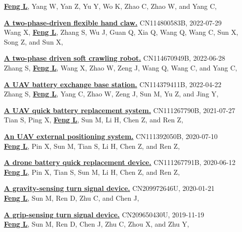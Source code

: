 \documentclass[a4paper,11pt]{article}
\begin{document}
\begin{enumerate}[leftmargin=*, labelsep=0.5em, align=left, itemindent=0em, label={[\arabic*]}]
\underline{\textbf{Feng L}}, Yang W, Yan Z, Yu Y, Wo K, Zhao C, Zhao W, and Yang C,
\item \href{https://patents.google.com/patent/CN114800583B}{\textbf{A two-phase-driven flexible hand claw.}} CN114800583B, 2022-07-29\\
Wang X, \underline{\textbf{Feng L}}, Zhang S, Wu J, Guan Q, Xia Q, Wang Q, Wang C, Sun X, Song Z, and Sun X,
\item \href{https://patents.google.com/patent/CN114670949B}{\textbf{A two-phase driven soft crawling robot.}} CN114670949B, 2022-06-28\\
Zhang S, \underline{\textbf{Feng L}}, Wang X, Zhao W, Zeng J, Wang Q, Wang C, and Yang C,
\item \href{https://patents.google.com/patent/CN114379411B}{\textbf{A UAV battery exchange base station.}} CN114379411B, 2022-04-22\\
Zhang S, \underline{\textbf{Feng L}}, Yang C, Zhao W, Zeng J, Sun M, Yu Z, and Jing Y,
\item \href{https://patents.google.com/patent/CN111267790B}{\textbf{A UAV quick battery replacement system.}} CN111267790B, 2021-07-27\\
Tian S, Ping X, \underline{\textbf{Feng L}}, Sun M, Li H, Chen Z, and Ren Z,
\item \href{https://patents.google.com/patent/CN111392050B}{\textbf{An UAV external positioning system.}} CN111392050B, 2020-07-10\\
\underline{\textbf{Feng L}}, Pin X, Sun M, Tian S, Li H, Chen Z, and Ren Z,
\item \href{https://patents.google.com/patent/CN111267791B}{\textbf{A drone battery quick replacement device.}} CN111267791B, 2020-06-12\\
\underline{\textbf{Feng L}}, Pin X, Tian S, Sun M, Li H, Chen Z, and Ren Z,
\item \href{https://patents.google.com/patent/CN209972646U}{\textbf{A gravity-sensing turn signal device.}} CN209972646U, 2020-01-21\\
\underline{\textbf{Feng L}}, Sun M, Ren D, Zhu C, and Chen J,
\item \href{https://patents.google.com/patent/CN209650430U}{\textbf{A grip-sensing turn signal device.}} CN209650430U, 2019-11-19\\
\underline{\textbf{Feng L}}, Sun M, Ren D, Chen J, Zhu C, Zhou X, and Zhu Y,
\end{enumerate}
\vspace{1mm}
\normalsize
\end{document}
